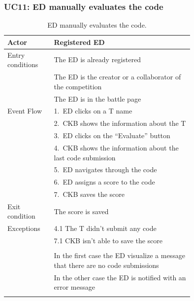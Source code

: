 \newpage

\subsubsection*{UC11: ED manually evaluates the code}
\begin{center}
  \begin{longtable}{l|p{0.75\linewidth}}
    \hline
    Actor & Registered ED \\
    \hline
    Entry conditions & The ED is already registered  \\
    & The ED is the creator or a collaborator of the competition \\
    & The ED is in the battle page \\
    \hline
    Event Flow & 1.\ ED clicks on a T name \\
    & 2.\ CKB shows the information about the T \\
    & 3.\ ED clicks on the “Evaluate” button \\
    & 4.\ CKB shows the information about the last code submission \\
    & 5.\ ED navigates through the code \\
    & 6.\ ED assigns a score to the code \\
    & 7.\ CKB saves the score \\
    \hline
    Exit condition &  The score is saved \\
    \hline
    Exceptions & 4.1 The T didn't submit any code \\
    & 7.1 CKB isn’t able to save the score \\ \\
    & In the first case the ED visualize a message that there are no code submissions \\
    & In the other case the ED is notified with an error message \\
    \hline
    \caption{ED manually evaluates the code.}
    \label{tab: ED_evaluate_code}
  \end{longtable}


\end{center}
